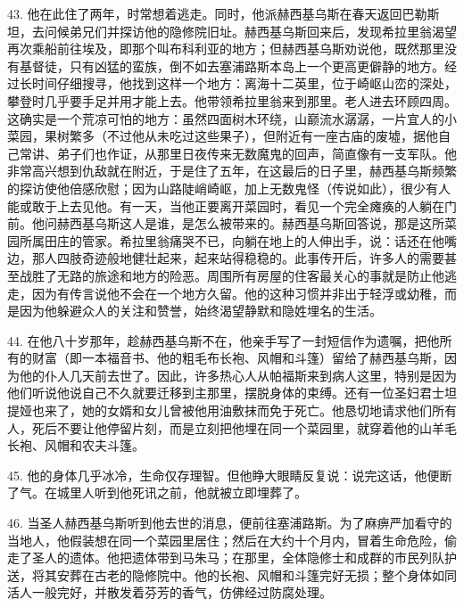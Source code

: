 43. 他在此住了两年，时常想着逃走。同时，他派赫西基乌斯在春天返回巴勒斯坦，去问候弟兄们并探访他的隐修院旧址。赫西基乌斯回来后，发现希拉里翁渴望再次乘船前往埃及，即那个叫布科利亚的地方；但赫西基乌斯劝说他，既然那里没有基督徒，只有凶猛的蛮族，倒不如去塞浦路斯本岛上一个更高更僻静的地方。经过长时间仔细搜寻，他找到这样一个地方：离海十二英里，位于崎岖山峦的深处，攀登时几乎要手足并用才能上去。他带领希拉里翁来到那里。老人进去环顾四周。这确实是一个荒凉可怕的地方：虽然四面树木环绕，山巅流水潺潺，一片宜人的小菜园，果树繁多（不过他从未吃过这些果子），但附近有一座古庙的废墟，据他自己常讲、弟子们也作证，从那里日夜传来无数魔鬼的回声，简直像有一支军队。他非常高兴想到仇敌就在附近，于是住了五年，在这最后的日子里，赫西基乌斯频繁的探访使他倍感欣慰；因为山路陡峭崎岖，加上无数鬼怪（传说如此），很少有人能或敢于上去见他。有一天，当他正要离开菜园时，看见一个完全瘫痪的人躺在门前。他问赫西基乌斯这人是谁，是怎么被带来的。赫西基乌斯回答说，那是这所菜园所属田庄的管家。希拉里翁痛哭不已，向躺在地上的人伸出手，说：话还在他嘴边，那人四肢奇迹般地健壮起来，起来站得稳稳的。此事传开后，许多人的需要甚至战胜了无路的旅途和地方的险恶。周围所有房屋的住客最关心的事就是防止他逃走，因为有传言说他不会在一个地方久留。他的这种习惯并非出于轻浮或幼稚，而是因为他躲避众人的关注和赞誉，始终渴望静默和隐姓埋名的生活。\par

44. 在他八十岁那年，趁赫西基乌斯不在，他亲手写了一封短信作为遗嘱，把他所有的财富（即一本福音书、他的粗毛布长袍、风帽和斗篷）留给了赫西基乌斯，因为他的仆人几天前去世了。因此，许多热心人从帕福斯来到病人这里，特别是因为他们听说他说自己不久就要迁移到主那里，摆脱身体的束缚。还有一位圣妇君士坦提娅也来了，她的女婿和女儿曾被他用油敷抹而免于死亡。他恳切地请求他们所有人，死后不要让他停留片刻，而是立刻把他埋在同一个菜园里，就穿着他的山羊毛长袍、风帽和农夫斗篷。\par

45. 他的身体几乎冰冷，生命仅存理智。但他睁大眼睛反复说：说完这话，他便断了气。在城里人听到他死讯之前，他就被立即埋葬了。\par

46. 当圣人赫西基乌斯听到他去世的消息，便前往塞浦路斯。为了麻痹严加看守的当地人，他假装想在同一个菜园里居住；然后在大约十个月内，冒着生命危险，偷走了圣人的遗体。他把遗体带到马朱马；在那里，全体隐修士和成群的市民列队护送，将其安葬在古老的隐修院中。他的长袍、风帽和斗篷完好无损；整个身体如同活人一般完好，并散发着芬芳的香气，仿佛经过防腐处理。\par

